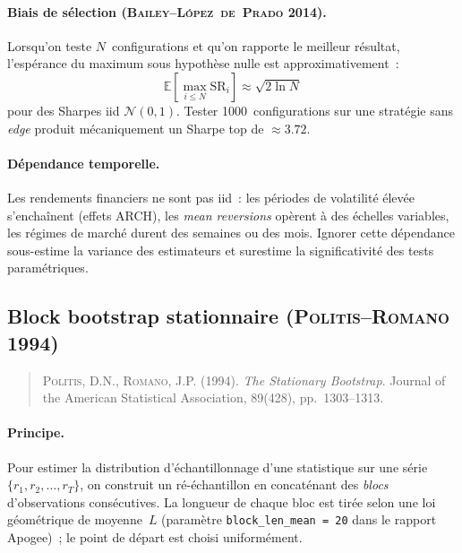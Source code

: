 \paragraph{Biais de sélection (\textsc{Bailey--L\'opez~de~Prado} 2014).} Lorsqu'on teste $N$~configurations et qu'on rapporte le meilleur résultat, l'espérance du maximum sous hypothèse nulle est approximativement~:
\begin{equation}
\mathbb{E}\left[\max_{i \leq N} \mathrm{SR}_{i}\right] \approx \sqrt{2 \ln N}
\label{eq:extreme_value_max_sharpe}
\end{equation}
pour des Sharpes iid $\mathcal{N}(0, 1)$. Tester 1000~configurations sur une stratégie sans \emph{edge} produit mécaniquement un Sharpe top de $\approx 3.72$.

\paragraph{Dépendance temporelle.} Les rendements financiers ne sont pas iid~: les périodes de volatilité élevée s'enchaînent (effets ARCH), les \emph{mean reversions} opèrent à des échelles variables, les régimes de marché durent des semaines ou des mois. Ignorer cette dépendance sous-estime la variance des estimateurs et surestime la significativité des tests paramétriques.

\subsection{Block bootstrap stationnaire (\textsc{Politis--Romano} 1994)}
\label{app:politis_romano}

\begin{quote}\small
\textsc{Politis}, D.N., \textsc{Romano}, J.P. (1994). \emph{The Stationary Bootstrap}. Journal of the American Statistical Association, 89(428), pp.~1303--1313.
\end{quote}

\paragraph{Principe.} Pour estimer la distribution d'échantillonnage d'une statistique sur une série $\{r_{1}, r_{2}, \ldots, r_{T}\}$, on construit un ré-échantillon en concaténant des \emph{blocs} d'observations consécutives. La longueur de chaque bloc est tirée selon une loi géométrique de moyenne~$L$ (paramètre \texttt{block\_len\_mean~=~20} dans le rapport Apogee)~; le point de départ est choisi uniformément.

